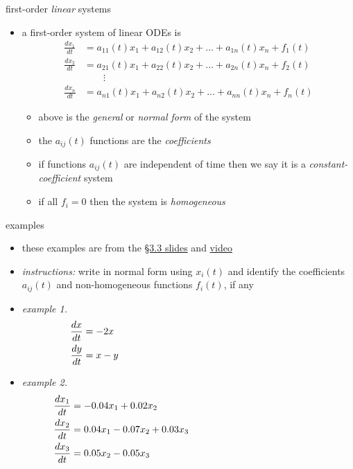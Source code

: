 \documentclass[urlcolor=blue,dvipsnames]{beamer}
\begin{document}
\begin{frame}{first-order \emph{linear} systems}

\begin{itemize}
\item a \alert{first-order system of linear ODEs} is
\begin{align*}
\frac{dx_1}{dt} &= a_{11}(t) x_1 + a_{12}(t) x_2 + \dots + a_{1n}(t) x_n + f_1(t) \\
\frac{dx_2}{dt} &= a_{21}(t) x_1 + a_{22}(t) x_2 + \dots + a_{2n}(t) x_n + f_2(t) \\
                &\qquad \vdots \\
\frac{dx_n}{dt} &= a_{n1}(t) x_1 + a_{n2}(t) x_2 + \dots + a_{nn}(t) x_n + f_n(t)
\end{align*}
     \begin{itemize}
     \item above is the \emph{general} or \emph{normal form} of the system
     \item the $a_{ij}(t)$ functions are the \emph{coefficients}
     \item if functions $a_{ij}(t)$ are independent of time then we say it is a \emph{constant-coefficient} system
     \item if all $f_i=0$ then the system is \emph{homogeneous}
     \end{itemize}
\end{itemize}
\end{frame}


\begin{frame}{examples}

\small
\begin{itemize}
\item these examples are from the \href{https://bueler.github.io/math302/assets/slides/3-3.pdf}{\S3.3 slides} and \href{https://drive.explaineverything.com/thecode/XAAUNGS}{video}
\item \emph{instructions:} write in normal form using $x_i(t)$ and identify the coefficients $a_{ij}(t)$ and non-homogeneous functions $f_i(t)$, if any
\item \emph{example 1.}
\begin{align*}
\frac{dx}{dt} &= - 2 x \hspace{70mm} \\
\frac{dy}{dt} &= x - y
\end{align*}
\item \emph{example 2.}
\begin{align*}
\frac{dx_1}{dt} &= -0.04 x_1 + 0.02 x_2 \hspace{60mm} \\
\frac{dx_2}{dt} &= 0.04 x_1 - 0.07 x_2 + 0.03 x_3 \\
\frac{dx_3}{dt} &= 0.05 x_2 - 0.05 x_3
\end{align*}
\end{itemize}
\end{frame}
\end{document}
